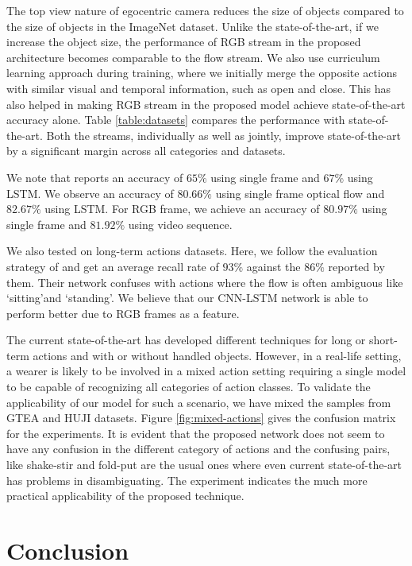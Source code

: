 \documentclass{article}
\begin{document}
The top view nature of egocentric camera reduces the size of objects compared to the size of objects in the ImageNet dataset. Unlike the state-of-the-art, if we increase the object size, the performance of RGB stream in the proposed architecture becomes comparable to the flow stream. We also use curriculum learning approach during training, where we initially merge the opposite actions with similar visual and temporal information, such as open and close. This has also helped in making RGB stream in the proposed model achieve state-of-the-art accuracy alone. Table \ref{table:datasets} compares the performance with state-of-the-art. Both the streams, individually as well as jointly, improve state-of-the-art by a significant margin across all categories and datasets.


We note that \cite{videoclass2015ng} reports an accuracy of $65\%$ using single frame and $67\%$ using LSTM. We observe an accuracy of $80.66\%$ using single frame optical flow and $82.67\%$ using LSTM. For RGB frame, we achieve an accuracy of $80.97\%$ using single frame and $81.92\%$ using video sequence.

We also tested on long-term actions datasets. Here, we follow the evaluation strategy of \cite{poleg2016compact} and get an average recall rate of  $93\%$ against the $86\%$ reported by them. Their network confuses with actions where the flow is often ambiguous like \lq sitting\rq and \lq standing\rq. We believe that our CNN-LSTM network is able to perform better due to RGB frames as a feature. %

The current state-of-the-art has developed different techniques for long or short-term actions and with or without handled objects. However, in a real-life setting, a wearer is likely to be involved in a mixed action setting requiring a single model to be capable of recognizing all categories of action classes. To validate the applicability of our model for such a scenario, we have mixed the samples from GTEA and HUJI datasets. Figure \ref{fig:mixed-actions} gives the confusion matrix for the experiments. It is evident that the proposed network does not seem to have any confusion in the different category of actions and the confusing pairs, like shake-stir and fold-put are the usual ones where even current state-of-the-art has problems in disambiguating. The experiment indicates the much more practical applicability of the proposed technique.

\section{Conclusion}
\end{document}
